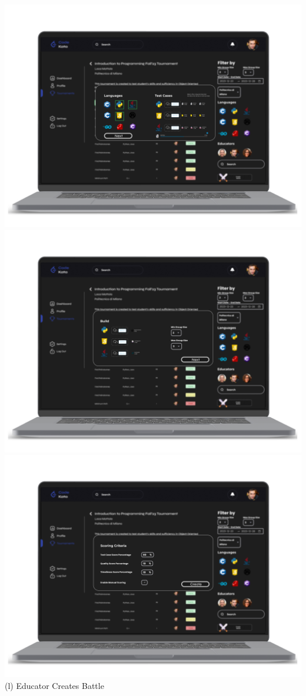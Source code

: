 \begin{center}
\includegraphics[scale=0.13]{Images/ui-ux/educator_creates_battle_4.png}
\includegraphics[scale=0.13]{Images/ui-ux/educator_creates_battle_5.png}
\includegraphics[scale=0.13]{Images/ui-ux/educator_creates_battle_6.png}
        (l) Educator Creates Battle
\end{center}
